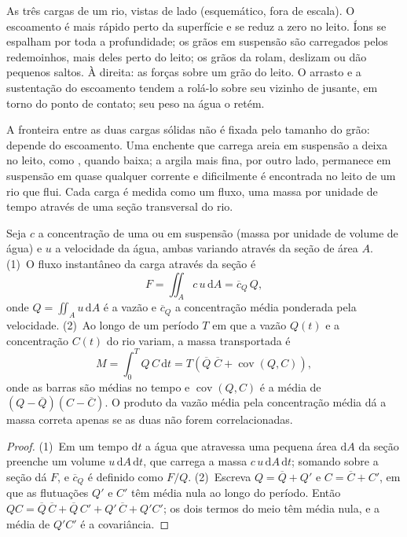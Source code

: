 \begin{omfigure}
{\small As três cargas de um rio, vistas de lado (esquemático, fora de escala). O escoamento é mais rápido perto da superfície e se reduz a zero no leito. Íons se espalham por toda a profundidade; os grãos em suspensão são carregados pelos redemoinhos, mais deles perto do leito; os grãos da  rolam, deslizam ou dão pequenos saltos. À direita: as forças sobre um grão do leito. O arrasto e a sustentação do escoamento tendem a rolá-lo sobre seu vizinho de jusante, em torno do ponto de contato; seu peso na água o retém.}
\label{fig:b1:erosion-transport:loads}
\end{omfigure}

A fronteira entre as duas cargas sólidas não é fixada pelo tamanho do grão: depende do escoamento. Uma enchente que carrega areia em suspensão a deixa no leito, como , quando baixa; a argila mais fina, por outro lado, permanece em suspensão em quase qualquer corrente e dificilmente é encontrada no leito de um rio que flui. Cada carga é medida como um fluxo, uma massa por unidade de tempo através de uma seção transversal do rio.

\begin{proposition}\label{prop:b1:erosion-transport:flux}
Seja $c$ a concentração de uma  ou em suspensão (massa por unidade de volume de água) e $u$ a velocidade da água, ambas variando através da seção de área $A$. (1)~O fluxo instantâneo da carga através da seção é
\[
  F = \iint_A c\,u\,\mathrm dA = \overline{c}_Q\,Q,
\]
onde $Q = \iint_A u\,\mathrm dA$ é a vazão e $\overline{c}_Q$ a concentração média ponderada pela velocidade. (2)~Ao longo de um período $T$ em que a vazão $Q(t)$ e a concentração $C(t)$ do rio variam, a massa transportada é
\[
  M = \int_0^T Q\,C\,\mathrm dt = T\left(\overline{Q}\;\overline{C} +
  \operatorname{cov}(Q, C)\right),
\]
onde as barras são médias no tempo e $\operatorname{cov}(Q, C)$ é a média de $(Q - \overline{Q})(C - \overline{C})$. O produto da vazão média pela concentração média dá a massa correta apenas se as duas não forem correlacionadas.
\end{proposition}

\begin{proof}
(1)~Em um tempo $\mathrm dt$ a água que atravessa uma pequena área $\mathrm dA$ da seção preenche um volume $u\,\mathrm dA\,\mathrm dt$, que carrega a massa $c\,u\,\mathrm dA\,\mathrm dt$; somando sobre a seção dá $F$, e $\overline{c}_Q$ é definido como $F/Q$.
(2)~Escreva $Q = \overline{Q} + Q'$ e $C =
\overline{C} + C'$, em que as flutuações $Q'$ e $C'$ têm média nula ao longo do período. Então $QC = \overline{Q}\,\overline{C} + \overline{Q}\,C' + Q'\,\overline{C}
+ Q'C'$; os dois termos do meio têm média nula, e a média de $Q'C'$ é a covariância.
\end{proof}

